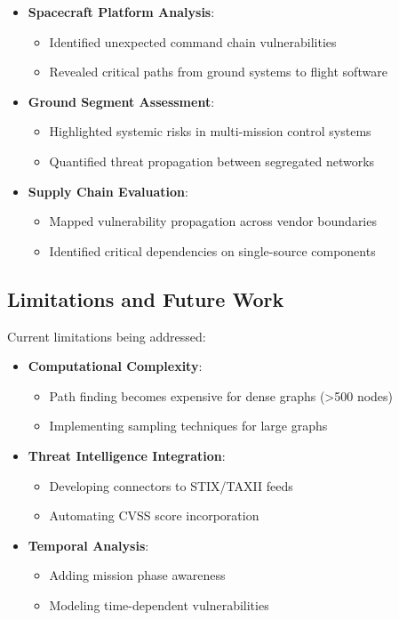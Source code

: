 \documentclass[binding=0.6cm]{sapthesis}
\begin{document}
\begin{itemize}
\item \textbf{Spacecraft Platform Analysis}:
\begin{itemize}
\item Identified unexpected command chain vulnerabilities
\item Revealed critical paths from ground systems to flight software
\end{itemize}

\item \textbf{Ground Segment Assessment}:
\begin{itemize}
    \item Highlighted systemic risks in multi-mission control systems
    \item Quantified threat propagation between segregated networks
\end{itemize}

\item \textbf{Supply Chain Evaluation}:
\begin{itemize}
    \item Mapped vulnerability propagation across vendor boundaries
    \item Identified critical dependencies on single-source components
\end{itemize}
\end{itemize}

\subsection{Limitations and Future Work}

Current limitations being addressed:

\begin{itemize}
\item \textbf{Computational Complexity}:
\begin{itemize}
\item Path finding becomes expensive for dense graphs (>500 nodes)
\item Implementing sampling techniques for large graphs
\end{itemize}

\item \textbf{Threat Intelligence Integration}:
\begin{itemize}
    \item Developing connectors to STIX/TAXII feeds
    \item Automating CVSS score incorporation
\end{itemize}

\item \textbf{Temporal Analysis}:
\begin{itemize}
    \item Adding mission phase awareness
    \item Modeling time-dependent vulnerabilities
\end{itemize}
\end{itemize}
\end{document}
